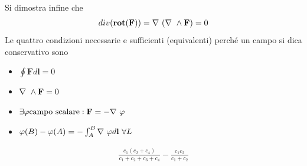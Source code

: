 \documentclass[
10pt, %
a4paper, %
oneside, %
headinclude,footinclude, %
BCOR5mm, %
]{scrartcl}
\begin{document}
Si dimostra infine che 
\[div(\mathbf{rot}(\mathbf{F})) =\mathbf{\nabla\ }(\mathbf{\nabla\ }\wedge\mathbf{F})=0\]
Le quattro condizioni necessarie e sufficienti (equivalenti) perché un campo si dica conservativo sono
\begin{itemize}
	\item \(\oint \mathbf{F}d\mathbf{l} = 0 \)
	\item \(\mathbf{\nabla\ }\wedge\mathbf{F} = 0\)
	\item \(\exists\varphi \text{campo scalare} : \mathbf{F}=-\mathbf{\nabla\ }\varphi\)
	\item \(\varphi(B)-\varphi(A) = -\int_{A}^{B}\mathbf{\nabla\ }\varphi d\mathbf{l}\ \forall L\)
\end{itemize}
\begin{align*}
\frac{c_1(c_2+c_4)}{c_1+c_2+c_3+c_4}-\frac{c_1c_2}{c_1+c_2}
\end{align*}
\newpage
\end{document}
